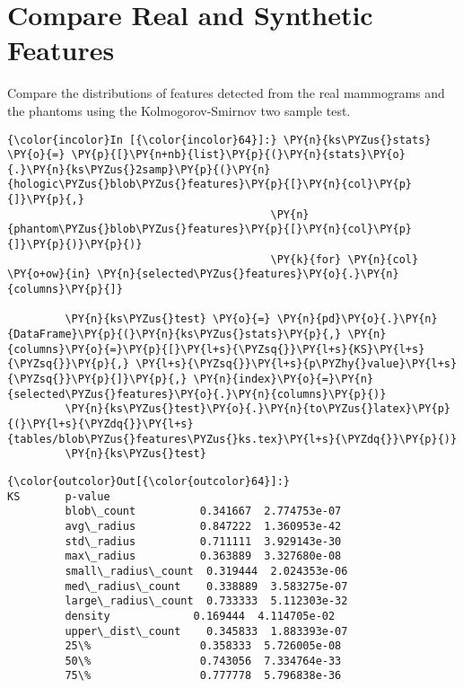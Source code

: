     \section{Compare Real and Synthetic
Features}\label{compare-real-and-synthetic-features}

    Compare the distributions of features detected from the real mammograms
and the phantoms using the Kolmogorov-Smirnov two sample test.

    \begin{Verbatim}[commandchars=\\\{\}]
{\color{incolor}In [{\color{incolor}64}]:} \PY{n}{ks\PYZus{}stats} \PY{o}{=} \PY{p}{[}\PY{n+nb}{list}\PY{p}{(}\PY{n}{stats}\PY{o}{.}\PY{n}{ks\PYZus{}2samp}\PY{p}{(}\PY{n}{hologic\PYZus{}blob\PYZus{}features}\PY{p}{[}\PY{n}{col}\PY{p}{]}\PY{p}{,}
                                         \PY{n}{phantom\PYZus{}blob\PYZus{}features}\PY{p}{[}\PY{n}{col}\PY{p}{]}\PY{p}{)}\PY{p}{)}
                                         \PY{k}{for} \PY{n}{col} \PY{o+ow}{in} \PY{n}{selected\PYZus{}features}\PY{o}{.}\PY{n}{columns}\PY{p}{]}

         \PY{n}{ks\PYZus{}test} \PY{o}{=} \PY{n}{pd}\PY{o}{.}\PY{n}{DataFrame}\PY{p}{(}\PY{n}{ks\PYZus{}stats}\PY{p}{,} \PY{n}{columns}\PY{o}{=}\PY{p}{[}\PY{l+s}{\PYZsq{}}\PY{l+s}{KS}\PY{l+s}{\PYZsq{}}\PY{p}{,} \PY{l+s}{\PYZsq{}}\PY{l+s}{p\PYZhy{}value}\PY{l+s}{\PYZsq{}}\PY{p}{]}\PY{p}{,} \PY{n}{index}\PY{o}{=}\PY{n}{selected\PYZus{}features}\PY{o}{.}\PY{n}{columns}\PY{p}{)}
         \PY{n}{ks\PYZus{}test}\PY{o}{.}\PY{n}{to\PYZus{}latex}\PY{p}{(}\PY{l+s}{\PYZdq{}}\PY{l+s}{tables/blob\PYZus{}features\PYZus{}ks.tex}\PY{l+s}{\PYZdq{}}\PY{p}{)}
         \PY{n}{ks\PYZus{}test}
\end{Verbatim}

            \begin{Verbatim}[commandchars=\\\{\}]
{\color{outcolor}Out[{\color{outcolor}64}]:}                           KS       p-value
         blob\_count          0.341667  2.774753e-07
         avg\_radius          0.847222  1.360953e-42
         std\_radius          0.711111  3.929143e-30
         max\_radius          0.363889  3.327680e-08
         small\_radius\_count  0.319444  2.024353e-06
         med\_radius\_count    0.338889  3.583275e-07
         large\_radius\_count  0.733333  5.112303e-32
         density             0.169444  4.114705e-02
         upper\_dist\_count    0.345833  1.883393e-07
         25\%                 0.358333  5.726005e-08
         50\%                 0.743056  7.334764e-33
         75\%                 0.777778  5.796838e-36
\end{Verbatim}

